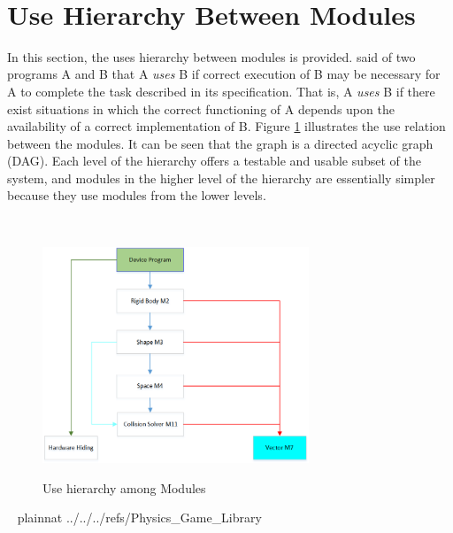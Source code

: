 \documentclass[12pt]{article}
\newcommand{\authornote}[3]{}
\newcommand{\olu}[1]{\authornote{red}{OO}{#1}}
\begin{document}
~\newpage

\section{Use Hierarchy Between Modules} \label{SecUse}

In this section, the uses hierarchy between modules is
provided. \citet{Parnas1978} said of two programs A and B that A {\em uses} B if correct execution of B may be necessary for A to complete the task described in its specification. That is, A {\em uses} B if there exist situations in which the correct functioning of A depends upon the availability of a correct implementation of B.  Figure \ref{Fig_uses} illustrates the use relation between the modules. It can be seen that the graph is a directed acyclic graph (DAG). Each level of the hierarchy offers a testable and usable subset of the system, and modules in the higher level of the hierarchy are essentially simpler because they use modules from the lower levels.

~\newpage
\begin{figure}[htbp]
\begin{center}
{
 \includegraphics[width=0.71\textwidth]{uses1}
}
\caption{\label{Fig_uses}Use hierarchy among Modules}
\end{center}
\end{figure}

~\newpage
 {plainnat}
 {../../../refs/Physics_Game_Library}
\end{document}
